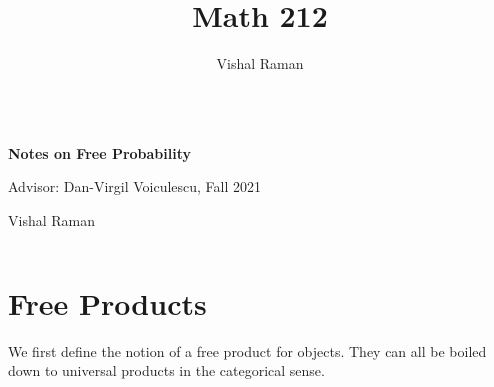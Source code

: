 \documentclass[11pt]{scrartcl}
\newcommand{\1}{\textbf{1}} %
\begin{document}
\title{Math 212}
\author{Vishal Raman}
\thispagestyle{empty}
$ $
\vfill
\begin{center}

\centerline{\huge \textbf{Notes on Free Probability}}
\centerline{Advisor: Dan-Virgil Voiculescu, Fall 2021}
\centerline{Vishal Raman}
\end{center}
\vfill
$ $
\newpage
\thispagestyle{empty}
\tableofcontents
\newpage

\section{Free Products}
We first define the notion of a free product for objects.  They can all be boiled down to universal products in the categorical sense.  
\end{document}
